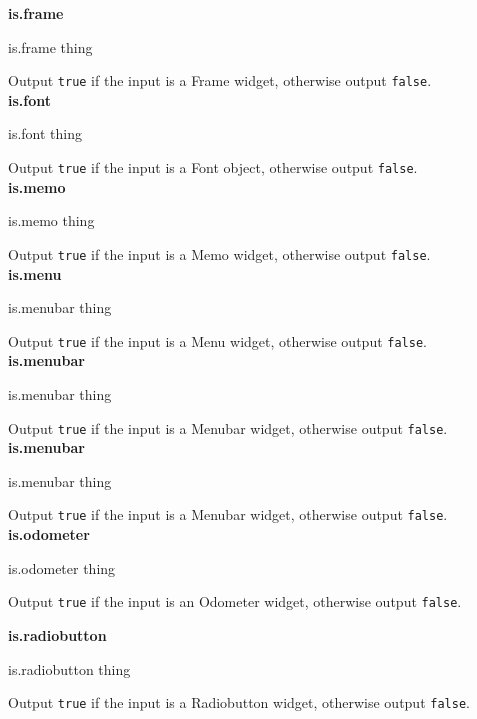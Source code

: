 {\bf is.frame} 
\begin{verbatimtab}
is.frame thing
\end{verbatimtab}
Output {\tt true} if the input is a Frame widget, otherwise output {\tt false}.\\

{\bf is.font} 
\begin{verbatimtab}
is.font thing
\end{verbatimtab}
Output {\tt true} if the input is a Font object, otherwise output {\tt false}.\\

{\bf is.memo} 
\begin{verbatimtab}
is.memo thing
\end{verbatimtab}
Output {\tt true} if the input is a Memo widget, otherwise output {\tt false}.\\

{\bf is.menu} 
\begin{verbatimtab}
is.menubar thing
\end{verbatimtab}
Output {\tt true} if the input is a Menu widget, otherwise output {\tt false}.\\

{\bf is.menubar} 
\begin{verbatimtab}
is.menubar thing
\end{verbatimtab}
Output {\tt true} if the input is a Menubar widget, otherwise output {\tt false}.\\

{\bf is.menubar} 
\begin{verbatimtab}
is.menubar thing
\end{verbatimtab}
Output {\tt true} if the input is a Menubar widget, otherwise output {\tt false}.\\

\cbstart
{\bf is.odometer} 
\begin{verbatimtab}
is.odometer thing
\end{verbatimtab}
Output {\tt true} if the input is an Odometer widget, otherwise output {\tt false}.\\
\cbend

{\bf is.radiobutton} 
\begin{verbatimtab}
is.radiobutton thing
\end{verbatimtab}
Output {\tt true} if the input is a Radiobutton widget, otherwise output {\tt false}.\\

